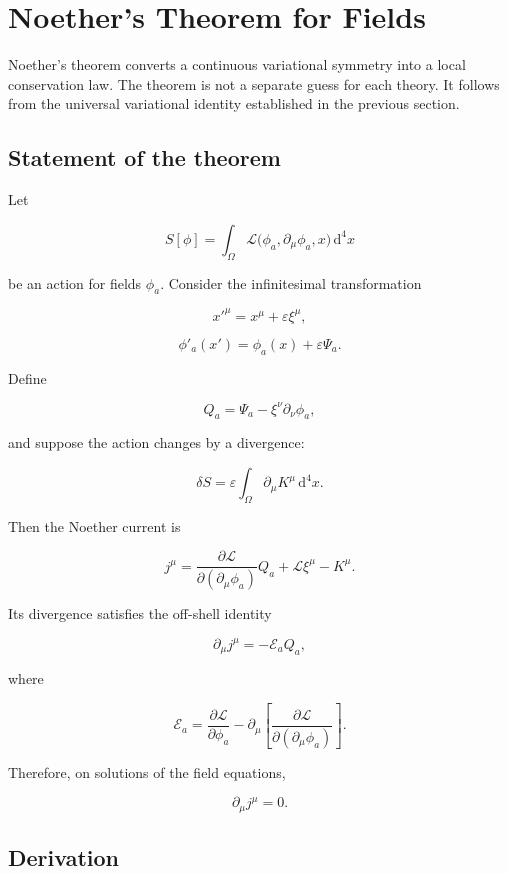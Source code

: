 \section{Noether's Theorem for Fields}
\label{sec:noether_theorem_fields}

Noether's theorem converts a continuous variational symmetry into a local conservation law. The theorem is not a separate guess for each theory. It follows from the universal variational identity established in the previous section.

\subsection{Statement of the theorem}

Let

\[
S[\phi]
=
\int_{\Omega}
\mathcal{L}
\bigl(
\phi_a,
\partial_{\mu}\phi_a,
x
\bigr)
\,\mathrm{d}^{4}x
\]

be an action for fields \(\phi_a\). Consider the infinitesimal transformation

\[
x'^{\mu}
=
x^{\mu}
+
\varepsilon\xi^{\mu},
\]

\[
\phi'_a(x')
=
\phi_a(x)
+
\varepsilon\Psi_a.
\]

Define

\[
Q_a
=
\Psi_a
-
\xi^{\nu}\partial_{\nu}\phi_a,
\]

and suppose the action changes by a divergence:

\[
\delta S
=
\varepsilon
\int_{\Omega}
\partial_{\mu}K^{\mu}
\,\mathrm{d}^{4}x.
\]

Then the Noether current is

\[
\boxed{
j^{\mu}
=
\frac{\partial\mathcal{L}}
{\partial(\partial_{\mu}\phi_a)}
Q_a
+
\mathcal{L}\xi^{\mu}
-
K^{\mu}
}.
\]

Its divergence satisfies the off-shell identity

\[
\boxed{
\partial_{\mu}j^{\mu}
=
-\mathcal{E}_aQ_a
},
\]

where

\[
\mathcal{E}_a
=
\frac{\partial\mathcal{L}}
{\partial\phi_a}
-
\partial_{\mu}
\left[
\frac{\partial\mathcal{L}}
{\partial(\partial_{\mu}\phi_a)}
\right].
\]

Therefore, on solutions of the field equations,

\[
\boxed{
\partial_{\mu}j^{\mu}=0
}.
\]

\subsection{Derivation}

